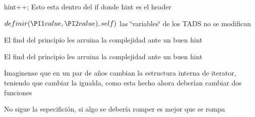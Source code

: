 \begin{DoxyRefList}
hint++; Esto esta dentro del if donde hint es el header  
\item[\label{bug__bug000014}%
\hypertarget{bug__bug000014}{}%
Miembro \hyperlink{classaed2_1_1map_a2ef6723c183916276b0afc4a4c721475_a2ef6723c183916276b0afc4a4c721475}{aed2\+:\+:map$<$ Key, Meaning, Compare $>$\+:\+:insert\+\_\+or\+\_\+assign} (\hyperlink{classaed2_1_1map_1_1const__iterator}{const\+\_\+iterator} hint, const value\+\_\+type \&value)]$ definir(\PI1 value, \PI2 value), self) $ las \char`\"{}variables\char`\"{} de los T\+A\+DS no se modifican

El find del principio les arruina la complejidad ante un buen hint

El find del principio les arruina la complejidad ante un buen hint 
\item[\label{bug__bug000026}%
\hypertarget{bug__bug000026}{}%
Miembro \hyperlink{classaed2_1_1map_1_1iterator_a836c7a166d63f507c4f79085ae953c51_a836c7a166d63f507c4f79085ae953c51}{aed2\+:\+:map$<$ Key, Meaning, Compare $>$\+:\+:iterator\+:\+:operator!=} (iterator other) const ]Imaginense que en un par de años cambian la estructura interna de iterator, teniendo que cambiar la igualda, como esta hecho ahora deberían cambiar dos funciones 
\item[\label{bug__bug000024}%
\hypertarget{bug__bug000024}{}%
Miembro \hyperlink{classaed2_1_1map_1_1iterator_a7c44de7f0508186e135ddbcfe782fec5_a7c44de7f0508186e135ddbcfe782fec5}{aed2\+:\+:map$<$ Key, Meaning, Compare $>$\+:\+:iterator\+:\+:operator++} ()]No sigue la especifición, si algo se debería romper es mejor que se rompa 


\end{DoxyRefList}
